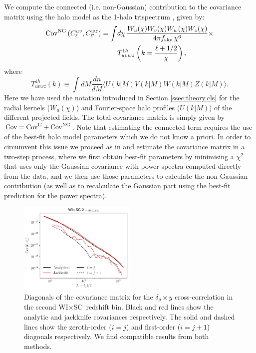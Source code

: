 \documentclass[useAMS,usenatbib]{mn2e}
\newcommand{\wisc}{WI$\times$SC}
\begin{document}
    We compute the connected (i.e. non-Gaussian) contribution to the covariance matrix using the halo model as the 1-halo trispectrum \citep{2002MNRAS.336.1256K}, given by:
    \begin{align}\nonumber
      {\rm Cov}^{\rm NG}\left(C^{uv}_\ell,C^{wz}_{\ell'}\right)=\int &d\chi\,\frac{W_u(\chi)W_v(\chi)W_w(\chi)W_z(\chi)}{4\pi f_{\rm sky}\,\chi^6}\times\\\label{eq:cov_ng}
      &T^{1h}_{uvwz}\left(k=\frac{\ell+1/2}{\chi}\right),
    \end{align}
    where
    \begin{equation}\nonumber
      T^{1h}_{uvwz}(k)\equiv\int dM\frac{dn}{dM}\langle U(k|M) V(k|M) W(k|M) Z(k|M)\rangle.
    \end{equation}
    Here we have used the notation introduced in Section \ref{ssec:theory.cls} for the radial kernels ($W_u(\chi)$) and Fourier-space halo profiles ($U(k|M)$) of the different projected fields. The total covariance matrix is simply given by ${\rm Cov}={\rm Cov}^{\rm G}+{\rm Cov}^{\rm NG}$. Note that estimating the connected term requires the use of the best-fit halo model parameters which we do not know a priori. In order to circumvent this issue we proceed as in \cite{2018MNRAS.473.4318A} and estimate the covariance matrix in a two-step process, where we first obtain best-fit parameters by minimising a $\chi^2$ that uses only the Gaussian covariance with power spectra computed directly from the data, and we then use those parameters to calculate the non-Gaussian contribution (as well as to recalculate the Gaussian part using the best-fit prediction for the power spectra).
    \begin{figure}
      \centering
      \includegraphics[width=0.5\textwidth]{cov_diag_wisc2.pdf}
      \caption{Diagonals of the covariance matrix for the $\delta_g\times y$ cross-correlation in the second \wisc~redshift bin. Black and red lines show the analytic and jackknife covariances respectively. The solid and dashed lines show the zeroth-order ($i=j$) and first-order ($i=j+1$) diagonals respectively. We find compatible results from both methods.}
      \label{fig:covdiag}
    \end{figure}
\end{document}
